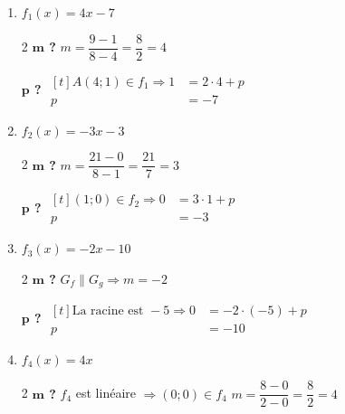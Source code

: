 \documentclass[a4paper, 12pt, parskip=half-]{scrartcl}
\begin{document}
\begin{solution}
    \raggedcolumns
    \begin{enumerate}
        \item $f_1(x) = 4x-7$

              \begin{multicols}{2}
                  \textbf{$\bm{m}$ ?}
                  \medbreak
                  $m=\dfrac{9-1}{8-4}=\dfrac{8}{2}=4$

                  \textbf{$\bm{p}$ ?}
                  \medbreak
                  $\begin{aligned}[t]
                          A(4;1)\in f_1 \Rightarrow 1 & = 2\cdot 4 + p \\
                          p                           & = -7
                      \end{aligned}$
              \end{multicols}
        \item $f_2(x) = -3x-3$
              \begin{multicols}{2}
                  \textbf{$\bm{m}$ ?}
                  \medbreak
                  $m=\dfrac{21-0}{8-1}=\dfrac{21}{7}=3$

                  \textbf{$\bm{p}$ ?}
                  \medbreak
                  $\begin{aligned}[t]
                          (1;0)\in f_2 \Rightarrow 0 & = 3\cdot 1 + p \\
                          p                             & = -3
                      \end{aligned}$
              \end{multicols}
        \item $f_3(x) = -2x - 10$
              \begin{multicols}{2}
                  \textbf{$\bm{m}$ ?}
                  \medbreak
                  $G_f \parallel G_g \Rightarrow m = -2$
                  \columnbreak

                  \textbf{$\bm{p}$ ?}
                  \medbreak
                  $\begin{aligned}[t]
                          \text{La racine est }-5\Rightarrow 0 & = -2\cdot (-5) + p \\
                          p                                    & = -10
                      \end{aligned}$
              \end{multicols}
        \item $f_4(x) = 4x$
              \begin{multicols}{2}
                  \textbf{$\bm{m}$ ?}
                  \medbreak
                  $f_4$ est linéaire $\Rightarrow (0;0) \in f_4$
                  \medbreak
                  $m = \dfrac{8-0}{2-0} = \dfrac{8}{2} = 4$
                  \columnbreak


\end{multicols}
\end{enumerate}
\end{solution}
\end{document}

